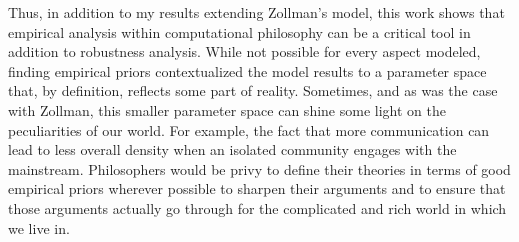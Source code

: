 Thus, in addition to my results extending Zollman's model, this work
shows that empirical analysis within computational philosophy can be a
critical tool in addition to robustness analysis. While not possible for
every aspect modeled, finding empirical priors contextualized the model
results to a parameter space that, by definition, reflects some part of
reality. Sometimes, and as was the case with Zollman, this smaller
parameter space can shine some light on the peculiarities of our world.
For example, the fact that more communication can lead to less overall
density when an isolated community engages with the mainstream.
Philosophers would be privy to define their theories in terms of good
empirical priors wherever possible to sharpen their arguments and to
ensure that those arguments actually go through for the complicated and
rich world in which we live in.
